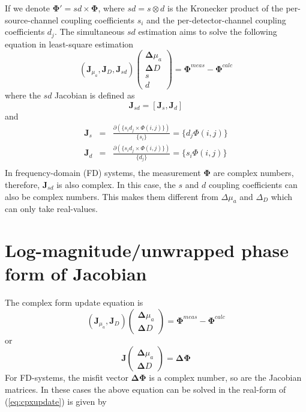 \documentclass[12pt]{book}               %
\begin{document}
If we denote $\mathbf{\Phi}'=sd\times\mathbf{\Phi}$, where $sd=s\otimes d$ is the Kronecker product of the per-source-channel coupling coefficients $s_i$ and the per-detector-channel coupling coefficients $d_j$. The simultaneous $sd$ estimation aims to solve the following equation in least-square estimation
\begin{equation}
\left(\mathbf{J}_{\mu_a},\mathbf{J}_{D},\mathbf{J}_{sd}\right)\left(
\begin{array}{c}
\boldsymbol{\Delta}{\mu_a}\\
\boldsymbol{\Delta}{D} \\
s\\d
\end{array}
\right)=\boldsymbol{\Phi}^{meas}-\boldsymbol{\Phi}^{calc}
\end{equation}
where the $sd$ Jacobian is defined as
\begin{equation}\label{eq:Jsd}
\mathbf{J}_{sd}=\left[\mathbf{J}_{s}, \mathbf{J}_{d}\right]
\end{equation}
and
\begin{eqnarray}\label{eq:JsJd}
\mathbf{J}_{s} &=& \frac{\partial(\{s_id_j\times\Phi(i,j)\})}{\{s_i\}}=\{d_j\Phi(i,j)\}\\
\mathbf{J}_{d} &=& \frac{\partial(\{s_id_j\times\Phi(i,j)\})}{\{d_j\}}=\{s_i\Phi(i,j)\}\\
\end{eqnarray}
In frequency-domain (FD) systems, the measurement $\mathbf\Phi$ are complex numbers, therefore, $\mathbf{J}_{sd}$ is also complex. In this case, the $s$ and $d$ coupling coefficients can also be complex numbers. This makes them different from $\Delta\mu_a$ and $\Delta_D$ which can only take real-values.

\section{Log-magnitude/unwrapped phase form of Jacobian}
The complex form update equation is
\begin{equation}
\left(\mathbf{J}_{\mu_a},\mathbf{J}_{D}\right)\left(
\begin{array}{l}
\boldsymbol{\Delta}{\mu_a}\\
\boldsymbol{\Delta}{D}
\end{array}
\right)=\boldsymbol{\Phi}^{meas}-\boldsymbol{\Phi}^{calc}
\end{equation}
or
\begin{equation}
\label{eq:cpxupdate} \mathbf{J}\left(
\begin{array}{l}
\boldsymbol{\Delta}{\mu_a}\\
\boldsymbol{\Delta}{D}
\end{array}
\right)=\boldsymbol{\Delta}\boldsymbol{\Phi}
\end{equation}
For FD-systems, the misfit vector $\mathbf{\Delta\Phi}$ is a complex number, so are the Jacobian matrices. In these cases the above equation can be solved in the real-form of (\ref{eq:cpxupdate}) is given by
\end{document}
